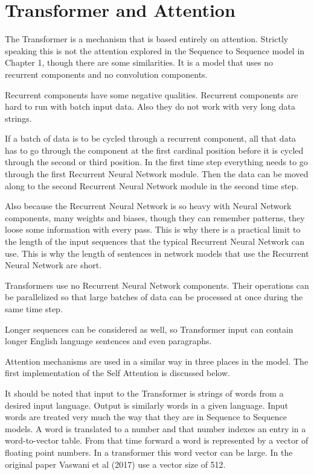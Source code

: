 
\section{Transformer and Attention}

The Transformer is a mechanism that is based entirely on attention. Strictly speaking this is not the attention explored in the Sequence to Sequence model in Chapter 1, though there are some similarities. It is a model that uses no recurrent components and no convolution components. 

Recurrent components have some negative qualities. Recurrent components are hard to run with batch input data. Also they do not work with very long data strings. 

If a batch of data is to be cycled through a recurrent component, all that data has to go through the component at the first cardinal position before it is cycled through the second or third position. In the first time step everything needs to go through the first Recurrent Neural Network module. Then the data can be moved along to the second Recurrent Neural Network  module in the second time step.

Also because the Recurrent Neural Network is so heavy with Neural Network components, many weights and biases, though they can remember patterns, they loose some information with every pass. This is why there is a practical limit to the length of the input sequences that the typical Recurrent Neural Network can use. This is why the length of sentences in network models that use the Recurrent Neural Network are short.

Transformers use no Recurrent Neural Network components. Their operations can be parallelized so that large batches of data can be processed at once during the same time step. 

Longer sequences can be considered as well, so Transformer input can contain longer English language sentences and even paragraphs.

Attention mechanisms are used in a similar way in three places in the model. The first implementation of the Self Attention is discussed below.

It should be noted that input to the Transformer is strings of words from a desired input language. Output is similarly words in a given language. Input words are treated very much the way that they are in Sequence to Sequence models. A word is translated to a number and that number indexes an entry in a word-to-vector table. From that time forward a word is represented by a vector of floating point numbers. In a transformer this word vector can be large. In the original paper Vaswani et al (2017)\cite{Vaswani2017AttentionIA} use a vector size of 512. 

